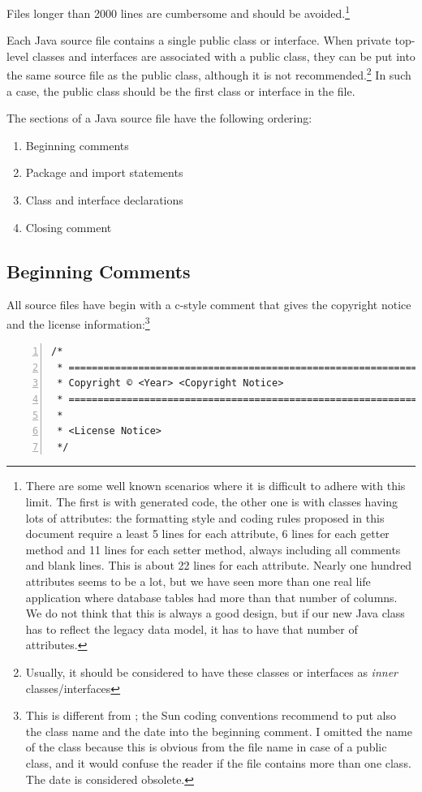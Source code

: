 \documentclass[12pt,a4paper,titlepage, parskip=half, headsepline, footsepline, cleardoubleplain]{scrbook}
\begin{document}
Files longer than 2000 lines are cumbersome and should be avoided.\footnote{There are some well known scenarios where it is difficult to adhere with this limit. The first is with generated code, the other one is with classes having lots of attributes: the formatting style and coding rules proposed in this document require a least 5 lines for each attribute, 6 lines for each getter method and 11 lines for each setter method, always including all comments and blank lines. This is about 22 lines for each attribute. Nearly one hundred attributes seems to be a lot, but we have seen more than one real life application where database tables had more than that number of columns. We do not think that this is always a good design, but if our new Java class has to reflect the legacy data model, it has to have that number of attributes.}

Each Java source file contains a single public class or interface. When private top-level classes and interfaces are associated with a public class, they can be put into the same source file as the public class, although it is not recommended.\footnote{Usually, it should be considered to have these classes or interfaces as \textit{inner} classes/interfaces} In such a case, the public class should be the first class or interface in the file.

The sections of a Java source file have the following ordering:

\begin{enumerate}[nosep]
\item{Beginning comments}
\item{Package and import statements}
\item{Class and interface declarations}
\item{Closing comment}
\end{enumerate}

\subsection{Beginning Comments}\label{sec:BeginningComments}
All source files have begin with a c-style comment that gives the copyright notice and the license information:\footnote{This is different from \autocite{SUN_CODE_CONVENTIONS}; the Sun coding conventions recommend to put also the class name and the date into the beginning comment. I omitted the name of the class because this is obvious from the file name in case of a public class, and it would confuse the reader if the file contains more than one class. The date is considered obsolete.}
\begin{lstlisting}[numbers=left,caption={Beginning Comment}]
/*
 * ==================================================================
 * Copyright © <Year> <Copyright Notice>
 * ==================================================================
 *
 * <License Notice>
 */
\end{lstlisting}
 
\end{document}
